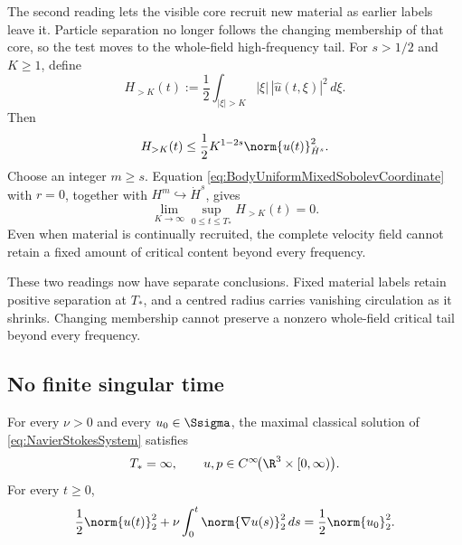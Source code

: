 The second reading lets the visible core recruit new material as earlier labels leave
it.
Particle separation no longer follows the changing membership of that core, so the test moves to the whole-field high-frequency tail.
For \(s>1/2\) and \(K\geq1\), define
\[
  H_{>K}(t)
  :=\frac12\int_{|\xi|>K}
  |\xi|\,|\widehat u(t,\xi)|^2\,d\xi.
\]
Then
\begin{equation}\label{eq:BodyUltravioletCriticalTail}
  H_{>K}(t)
  \leq
  \frac12K^{1-2s}\norm{u(t)}_{\dot H^s}^2.
\end{equation}
Choose an integer \(m\geq s\).
Equation \eqref{eq:BodyUniformMixedSobolevCoordinate} with \(r=0\), together with
\(H^m\hookrightarrow\dot H^s\), gives
\begin{equation}\label{eq:BodyUniformUltravioletVanishing}
  \lim_{K\to\infty}
  \sup_{0\leq t\leq T_*}H_{>K}(t)=0.
\end{equation}
Even when material is continually recruited, the complete velocity field cannot retain a fixed amount of critical content beyond every frequency.

These two readings now have separate conclusions.
Fixed material labels retain positive separation at \(T_*\), and a centred radius carries vanishing circulation as it shrinks.
Changing membership cannot preserve a nonzero whole-field critical tail beyond every frequency.

\subsection{No finite singular time}\label{sub:NoFiniteSingularTime}

\begin{theorem}\label{thm:MainGlobalRegularity}
For every \(\nu>0\) and every \(u_0\in\Ssigma\), the maximal classical solution of \eqref{eq:NavierStokesSystem} satisfies
\begin{equation}\label{eq:BodyGlobalSmoothnessConclusion}
  T_*=\infty,
  \qquad
  u,p\in C^\infty\!\bigl(\R^3\times[0,\infty)\bigr).
\end{equation}
For every \(t\geq0\),
\begin{equation}\label{eq:GlobalEnergyConclusion}
  \frac12\norm{u(t)}_2^2
  +\nu\int_0^t\norm{\nabla u(s)}_2^2\,ds
  =\frac12\norm{u_0}_2^2.
\end{equation}
\end{theorem}

